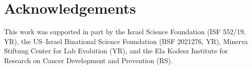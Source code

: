 \documentclass[12pt]{extarticle}
\begin{document}


{\small
\section*{Acknowledgements}
This work was supported in part by
the Israel Science Foundation (ISF 552/19, YR),
the US–Israel Binational Science Foundation (BSF 2021276, YR), 
Minerva Stiftung Center for Lab Evolution (YR), 
and the Ela Kodesz Institute for Research on Cancer Development and Prevention (RS).
}

\nolinenumbers
%



\end{document}
